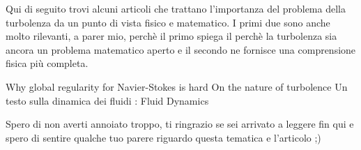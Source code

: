 Qui di seguito trovi alcuni articoli che trattano l'importanza del problema della turbolenza da un punto di vista fisico e matematico. I primi due sono anche molto rilevanti, a parer mio, perchè il primo spiega il perchè la turbolenza sia ancora un problema matematico aperto e il secondo ne fornisce una comprensione fisica più completa.

Why global regularity for Navier-Stokes is hard
On the nature of turbolence
Un testo sulla dinamica dei fluidi : Fluid Dynamics

Spero di non averti annoiato troppo, ti ringrazio se sei arrivato a leggere fin qui e spero di sentire qualche tuo parere riguardo questa tematica e l'articolo ;)